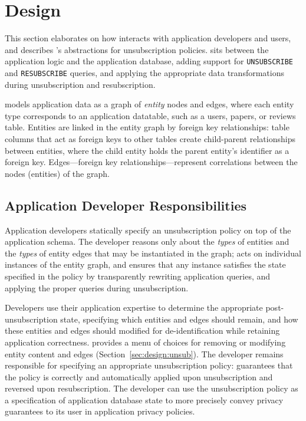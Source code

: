 \section{Design}
This section elaborates on how \sys interacts with application developers and users, and describes
\sys's abstractions for unsubscription policies.
\sys sits between the application logic and the application database, adding support for
\texttt{UNSUBSCRIBE} and \texttt{RESUBSCRIBE} queries, and applying the appropriate data transformations
during unsubscription and resubscription.

\sys models application data as a graph of \emph{entity}
nodes and edges, where each entity type corresponds to an application datatable, such as a users,
papers, or reviews table.  Entities are linked in the entity graph by foreign key relationships:
table columns that act as foreign keys to other tables create child-parent relationships between
entities, where the child entity holds the parent entity's identifier as a foreign key. 
Edges---foreign key relationships---represent correlations between the nodes (entities) of the
graph.

\subsection{Application Developer Responsibilities}
Application developers statically specify an unsubscription policy on top of the application schema.
The developer reasons only about the \emph{types} of entities
and the \emph{types} of entity edges that may be instantiated in the graph; \sys acts on individual
instances of the entity graph, and ensures that any instance satisfies the state specified in the
policy by transparently rewriting application queries, and applying the proper queries during
unsubscription.

Developers use their application expertise to determine the appropriate post-unsubscription state,
specifying which entities and edges should remain, and how these entities and edges should modified
for de-identification while retaining application correctness. \sys provides a menu of choices  
for removing or modifying entity content and edges (Section~\ref{sec:design:unsub}).
The developer remains responsible for specifying an appropriate unsubscription policy: \sys
guarantees that the policy is correctly and automatically applied upon unsubscription and reversed
upon resubscription. The developer can use the unsubscription policy as a specification of
application database state to more precisely convey privacy guarantees to its user in \eg
application privacy policies.

